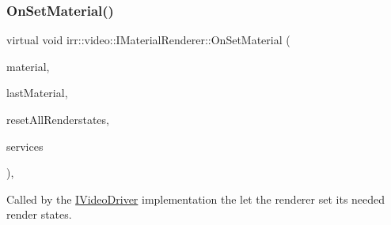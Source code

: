 \subsubsection{\texorpdfstring{On\+Set\+Material()}{OnSetMaterial()}\hspace{0.1cm}{\footnotesize\ttfamily [1/2]}}
{\footnotesize\ttfamily virtual void irr\+::video\+::\+I\+Material\+Renderer\+::\+On\+Set\+Material (\begin{DoxyParamCaption}\item[{const \hyperlink{classirr_1_1video_1_1SMaterial}{S\+Material} \&}]{material,  }\item[{const \hyperlink{classirr_1_1video_1_1SMaterial}{S\+Material} \&}]{last\+Material,  }\item[{bool}]{reset\+All\+Renderstates,  }\item[{\hyperlink{classirr_1_1video_1_1IMaterialRendererServices}{I\+Material\+Renderer\+Services} $\ast$}]{services }\end{DoxyParamCaption})\hspace{0.3cm}{\ttfamily [inline]}, {\ttfamily [virtual]}}



Called by the \hyperlink{classirr_1_1video_1_1IVideoDriver}{I\+Video\+Driver} implementation the let the renderer set its needed render states. 

